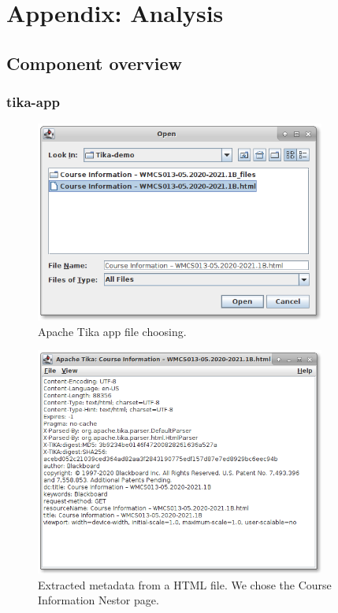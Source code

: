 \documentclass{article}
\begin{document}


\appendix
\section{Appendix: Analysis}
\subsection{Component overview}
\subsubsection{tika-app}
\begin{figure}[ht]
    \centering
    \includegraphics[width=0.85\textwidth]{report/images/tika_app/filechooser.png}
    \caption{Apache Tika app file choosing.}
    \label{fig:tika_app/filechooser}
\end{figure}
\begin{figure}[ht]
    \centering
    \includegraphics[width=0.85\textwidth]{report/images/tika_app/metadata.png}
    \caption{Extracted metadata from a HTML file. We chose the Course Information Nestor page.}
    \label{fig:tika_app/metadata}
\end{figure}
\end{document}

